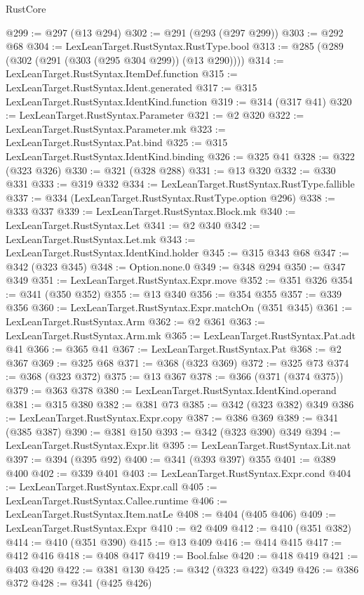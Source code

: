 \begin{lexlean}{RustCore}
\begin{coremodule}
@299 := @297 (@13 @294)
@302 := @291 (@293 (@297 @299))
@303 := @292 @68
@304 := LexLeanTarget.RustSyntax.RustType.bool
@313 := @285 (@289 (@302 (@291 (@303 (@295 @304 @299)) (@13 @290))))
@314 := LexLeanTarget.RustSyntax.ItemDef.function
@315 := LexLeanTarget.RustSyntax.Ident.generated
@317 := @315 LexLeanTarget.RustSyntax.IdentKind.function
@319 := @314 (@317 @41)
@320 := LexLeanTarget.RustSyntax.Parameter
@321 := @2 @320
@322 := LexLeanTarget.RustSyntax.Parameter.mk
@323 := LexLeanTarget.RustSyntax.Pat.bind
@325 := @315 LexLeanTarget.RustSyntax.IdentKind.binding
@326 := @325 @41
@328 := @322 (@323 @326)
@330 := @321 (@328 @288)
@331 := @13 @320
@332 := @330 @331
@333 := @319 @332
@334 := LexLeanTarget.RustSyntax.RustType.fallible
@337 := @334 (LexLeanTarget.RustSyntax.RustType.option @296)
@338 := @333 @337
@339 := LexLeanTarget.RustSyntax.Block.mk
@340 := LexLeanTarget.RustSyntax.Let
@341 := @2 @340
@342 := LexLeanTarget.RustSyntax.Let.mk
@343 := LexLeanTarget.RustSyntax.IdentKind.holder
@345 := @315 @343 @68
@347 := @342 (@323 @345)
@348 := Option.none.{0}
@349 := @348 @294
@350 := @347 @349
@351 := LexLeanTarget.RustSyntax.Expr.move
@352 := @351 @326
@354 := @341 (@350 @352)
@355 := @13 @340
@356 := @354 @355
@357 := @339 @356
@360 := LexLeanTarget.RustSyntax.Expr.matchOn (@351 @345)
@361 := LexLeanTarget.RustSyntax.Arm
@362 := @2 @361
@363 := LexLeanTarget.RustSyntax.Arm.mk
@365 := LexLeanTarget.RustSyntax.Pat.adt @41
@366 := @365 @41
@367 := LexLeanTarget.RustSyntax.Pat
@368 := @2 @367
@369 := @325 @68
@371 := @368 (@323 @369)
@372 := @325 @73
@374 := @368 (@323 @372)
@375 := @13 @367
@378 := @366 (@371 (@374 @375))
@379 := @363 @378
@380 := LexLeanTarget.RustSyntax.IdentKind.operand
@381 := @315 @380
@382 := @381 @73
@385 := @342 (@323 @382) @349
@386 := LexLeanTarget.RustSyntax.Expr.copy
@387 := @386 @369
@389 := @341 (@385 @387)
@390 := @381 @150
@393 := @342 (@323 @390) @349
@394 := LexLeanTarget.RustSyntax.Expr.lit
@395 := LexLeanTarget.RustSyntax.Lit.nat
@397 := @394 (@395 @92)
@400 := @341 (@393 @397) @355
@401 := @389 @400
@402 := @339 @401
@403 := LexLeanTarget.RustSyntax.Expr.cond
@404 := LexLeanTarget.RustSyntax.Expr.call
@405 := LexLeanTarget.RustSyntax.Callee.runtime
@406 := LexLeanTarget.RustSyntax.Item.natLe
@408 := @404 (@405 @406)
@409 := LexLeanTarget.RustSyntax.Expr
@410 := @2 @409
@412 := @410 (@351 @382)
@414 := @410 (@351 @390)
@415 := @13 @409
@416 := @414 @415
@417 := @412 @416
@418 := @408 @417
@419 := Bool.false
@420 := @418 @419
@421 := @403 @420
@422 := @381 @130
@425 := @342 (@323 @422) @349
@426 := @386 @372
@428 := @341 (@425 @426)

\end{coremodule}
\end{lexlean}
